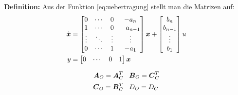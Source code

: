 \textbf{Definition:}
Aus der Funktion \ref{eq:uebertragung} stellt man die Matrizen auf:
    \begin{align*}
        \dot{\boldsymbol{x}} &= 
        \begin{bmatrix}
            0 &  \cdots & 0 &-a_n\\
            1 &\cdots & 0 & -a_{n-1} \\
            \vdots&\ddots&\vdots&\vdots\\
            0&\cdots&1&-a_1
        \end{bmatrix}\boldsymbol{x}+ 
        \begin{bmatrix}
            b_n \\ b_{n-1} \\ \vdots \\b_1
        \end{bmatrix} u \\
        y&= \begin{bmatrix}
            0 & \cdots & 0& 1
        \end{bmatrix} \boldsymbol{x}
    \end{align*}
    \begin{tcolorbox}[colback=white!10!white,colframe=gray!70!black,title=Umrechnungsregeln]
        \begin{align*}
            \boldsymbol{A}_O = \boldsymbol{A}_C^T &\hspace{0.3cm} \boldsymbol{B}_O = \boldsymbol{C}_C^T \\
            \boldsymbol{C}_O = \boldsymbol{B}_C^T   &\hspace{0.3cm} D_O = D_C
        \end{align*}
    
    \end{tcolorbox}
